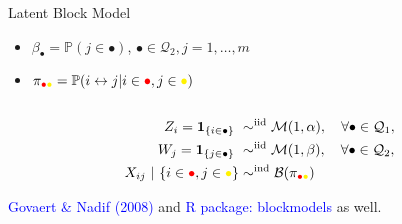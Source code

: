 \documentclass[nopagenumber,9pt]{beamer}
\begin{document}
\begin{frame}
\begin{center}
\begin{overlayarea}{\textwidth}{.5\textheight}
\begin{columns}
\begin{column}{.5\paperwidth}
\begin{small}
\begin{block}{Latent Block Model}
\begin{itemize}
               \item  $\beta_\bullet  =  \mathbb{P}(j  \in  \bullet)$,
                $\bullet\in\mathcal{Q}_2,j=1,\dots,m$
              \item      $\pi_{\textcolor{red}{\bullet}\textcolor{yellow}{\bullet}}     =      \mathbb{P}(i
                \leftrightarrow j | i\in\textcolor{red}{\bullet},j\in\textcolor{yellow}{\bullet})$
              \end{itemize}
            \end{block}
          \end{small}
        \end{column}
      \end{columns}
    \end{overlayarea}
  \end{center}
  

\begin{align*}
Z_i = \mathbf{1}_{\{i \in \bullet\}}  \ & \sim^{\text{iid}} \mathcal{M}(1,\alpha), \quad \forall\bullet \in \mathcal{Q}_1, \\ 
W_j=\mathbf{1}_{\{j \in \bullet\}}  \ & \sim^{\text{iid}} \mathcal{M}(1,\beta), \quad \forall\bullet \in \mathcal{Q}_2, \\
X_{ij} \ | \ \{i\in\textcolor{red}{\bullet},j\in\textcolor{yellow}{\bullet}\}
& \sim^{\text{ind}} \mathcal{B}(\pi_{\textcolor{red}{\bullet}\textcolor{yellow}{\bullet}})\\
\end{align*}


\textcolor{blue}{Govaert \& Nadif (2008)} and 
\textcolor{blue}{R package: blockmodels} as well.

\end{frame}
\end{document}
